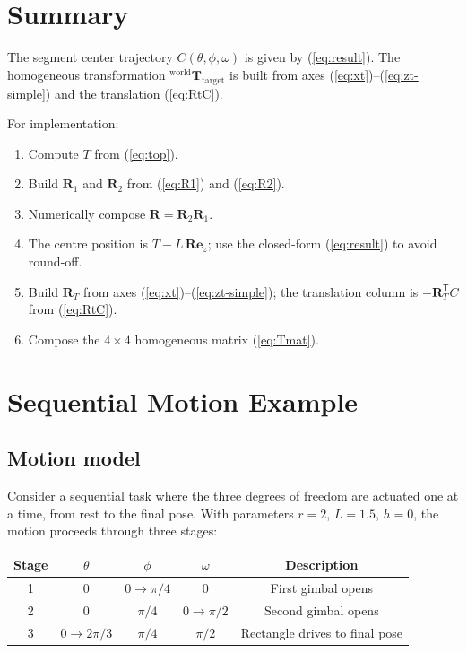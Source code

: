 \documentclass[12pt,a4paper]{article}
\newcommand{\Rd}{\mathbf{R}}
\newcommand{\Rone}{\Rd_1}
\newcommand{\Rtwo}{\Rd_2}
\newcommand{\RT}{\Rd_T}
\newcommand{\Rcom}{\Rd}
\begin{document}
\section{Summary}

The segment center trajectory $C(\theta,\phi,\omega)$ is given by (\ref{eq:result}).
The homogeneous transformation ${}^{\text{world}}\mathbf{T}_{\text{target}}$ is built
from axes (\ref{eq:xt})--(\ref{eq:zt-simple}) and the translation (\ref{eq:RtC}).

For implementation:

\begin{enumerate}[leftmargin=*]
  \item Compute $T$ from (\ref{eq:top}).
  \item Build $\Rone$ and $\Rtwo$ from (\ref{eq:R1}) and (\ref{eq:R2}).
  \item Numerically compose $\Rcom = \Rtwo\Rone$.
  \item The centre position is $T - L\,\Rcom\mathbf{e}_z$; use the closed-form
    (\ref{eq:result}) to avoid round-off.
  \item Build $\RT$ from axes (\ref{eq:xt})--(\ref{eq:zt-simple});
    the translation column is $-\RT^\mathsf{T}C$ from (\ref{eq:RtC}).
  \item Compose the $4\times4$ homogeneous matrix (\ref{eq:Tmat}).
\end{enumerate}

\section{Sequential Motion Example}
\label{sec:sequential}

\subsection{Motion model}

Consider a sequential task where the three degrees of freedom are actuated one
at a time, from rest to the final pose.  With parameters $r=2$, $L=1.5$, $h=0$,
the motion proceeds through three stages:

\begin{center}
\begin{tabular}{@{}ccccc@{}}
  \toprule
  Stage & $\theta$ & $\phi$ & $\omega$ & Description \\
  \midrule
  1 & $0$                 & $0\to\pi/4$  & $0$       & First gimbal opens \\
  2 & $0$                 & $\pi/4$      & $0\to\pi/2$ & Second gimbal opens \\
  3 & $0\to 2\pi/3$       & $\pi/4$      & $\pi/2$   & Rectangle drives to final pose \\
  \bottomrule
\end{tabular}
\end{center}
\end{document}

